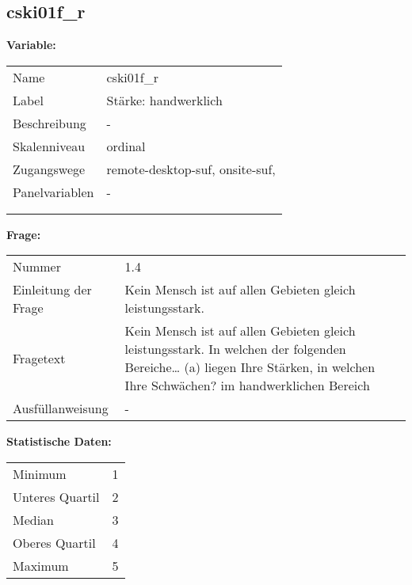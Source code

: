 	
	
	\subsection{cski01f\_r}
	\label{subSection:cski01f_r}

	\noindent\textbf{Variable:}\\
		\begin{tabular}{lL{11.3cm}}
			\label{tableVariable:cski01f_r}
			Name & cski01f\_r \\
			Label & Stärke: handwerklich \\
			Beschreibung & - \\
			Skalenniveau & ordinal \\
			Zugangswege &
				remote-desktop-suf,
				onsite-suf,
 \\
			Panelvariablen & -
			 \\
			 \\
 \\
		\end{tabular}

		\vspace*{1 cm}
		\noindent\textbf{Frage:}\\
		\begin{tabular}{lL{11.3cm}}
			\label{tableQuestion:cski01f_r}
			Nummer & 1.4 \\
			Einleitung der Frage & Kein Mensch ist auf allen Gebieten gleich leistungsstark. \\
			Fragetext & Kein Mensch ist auf allen Gebieten gleich leistungsstark. In welchen der folgenden Bereiche…
(a) liegen Ihre Stärken, in welchen Ihre Schwächen?
im handwerklichen Bereich \\
			Ausfüllanweisung & - \\
		\end{tabular}


		\vspace*{1 cm}
		\noindent\textbf{Statistische Daten:}\\
			\begin{tabular}{ll}
				\label{tableStatistics:cski01f_r}
					Minimum & 1 \\
					Unteres Quartil & 2 \\
					Median & 3 \\
					Oberes Quartil & 4 \\
					Maximum & 5 \\
			\end{tabular}



